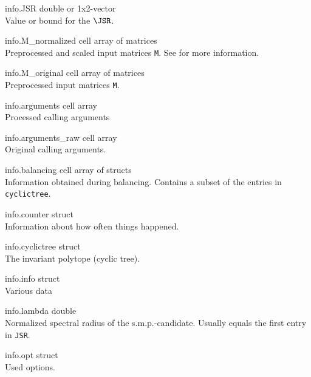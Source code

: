 \begin{param}
\item[info.JSR] double or 1x2-vector\\Value or bound for the $\JSR$.
\item[info.M\_normalized] cell array of matrices\\Preprocessed and scaled input matrices \texttt{M}. See  for more information.
\item[info.M\_original] cell array of matrices\\ Preprocessed input matrices \texttt{M}.
\item[info.arguments] cell array\\ Processed calling arguments
\item[info.arguments\_raw] cell array\\ Original calling arguments.
\item[info.balancing] cell array of structs\\ Information obtained during balancing. Contains a subset of the entries in \texttt{cyclictree}.
\item[info.counter] struct\\ Information about how often things happened.
\item[info.cyclictree] struct\\ The invariant polytope (cyclic tree).
\item[info.info] struct\\ Various data 
\item[info.lambda] double\\ Normalized spectral radius of the s.m.p.-candidate. Usually equals the first entry in \texttt{JSR}.
\item[info.opt] struct\\ Used options.
\end{param}

